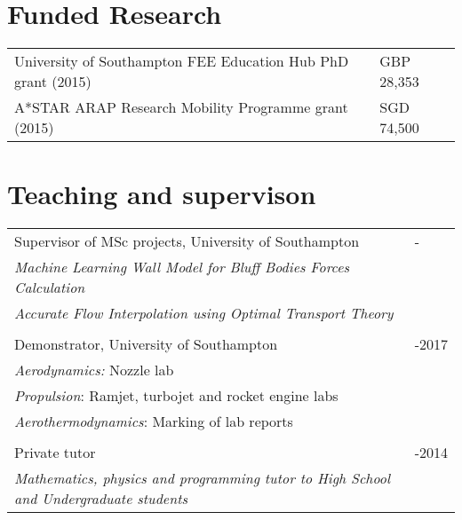 \documentclass[line]{res}
\newenvironment{p1}
  {\begin{adjustwidth}{-16pt}{0pt}
  \vspace{1pt}}
  {\end{adjustwidth}}
\newenvironment{p3}
  {\begin{adjustwidth}{-16pt}{0pt}
  \vspace{3pt}}
  {\end{adjustwidth}}
\begin{document}
\begin{resume}
\section{Funded Research}
\begin{p3}
\begin{tabular}{p{} >{\raggedleft\arraybackslash}p{}}
University of Southampton FEE Education Hub PhD grant (2015) & GBP 28,353\\
A*STAR ARAP Research Mobility Programme grant (2015) & SGD 74,500
\end{tabular}
\end{p3}

\section{Teaching and supervison}
\begin{p1}
\begin{tabular}{p{} >{\raggedleft\arraybackslash}p{}}
Supervisor of MSc projects, University of Southampton & 2019-\\ 
\textit{Machine Learning Wall Model for Bluff Bodies Forces
Calculation} &\\
\textit{Accurate Flow Interpolation using Optimal Transport Theory} &\\
\\
Demonstrator, University of Southampton & 2015-2017\\ 
\textit{Aerodynamics:} Nozzle lab &\\
\textit{Propulsion}: Ramjet, turbojet and rocket engine labs &\\
\textit{Aerothermodynamics}: Marking of lab reports & \\
\\
Private tutor & 2011-2014\\ 
\textit{Mathematics, physics and programming tutor to High School and Undergraduate students}&
\end{tabular}
\end{p1}


\end{resume}
\end{document}
